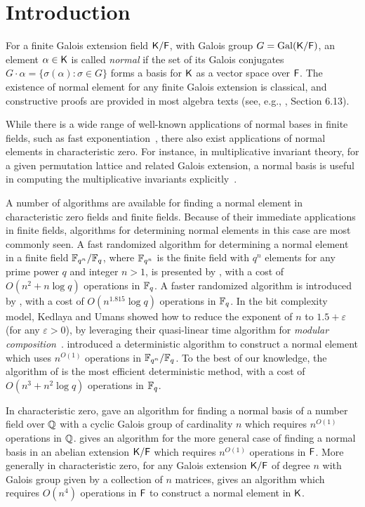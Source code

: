 \section{Introduction}

For a finite Galois extension field ${\mathsf{K}}/{\mathsf{F}}$, with Galois group $G =
\mathrm{Gal}({\mathsf{K}}/{\mathsf{F}})$, an element $\alpha \in {\mathsf{K}}$ is called
\emph{normal} if the set of its Galois conjugates $G \cdot \alpha =
\{ \sigma(\alpha): \sigma\in G\}$ forms a basis for ${\mathsf{K}}$ as a vector space over
${\mathsf{F}}$. The existence of normal element for any finite Galois extension
is classical, and constructive proofs are provided in most algebra texts
(see, e.g., \cite{Lang}, Section 6.13).
 
While there is a wide range of well-known applications of normal bases in
finite fields, such as fast exponentiation~\cite{GaGaPaSh00}, there also
exist applications of normal elements in characteristic zero.  For instance,
in multiplicative invariant theory, for a given permutation lattice and
related Galois extension, a normal basis is useful in computing the
multiplicative invariants explicitly~\cite{Jam18}.

A number of algorithms are available for finding a normal element in
characteristic zero fields and finite fields.  Because of their immediate
applications in finite fields, algorithms for determining normal elements
in this case are most commonly seen.  A fast randomized algorithm for
determining a normal element in a finite field ${\mathbb{F}}_{q^n}/{\mathbb{F}}_q$, where
${\mathbb{F}}_{q^n}$ is the finite field with $q^n$ elements for any prime power $q$
and integer $n>1$, is presented by , with a cost of
$O(n^2+n\log q)$ operations in ${\mathbb{F}}_q$.  A faster randomized algorithm is
introduced by , with a cost of $O(n^{1.815}\log q)$
operations in ${\mathbb{F}}_q$.  In the bit complexity model, Kedlaya and Umans showed
how to reduce the exponent of $n$ to $1.5+\varepsilon$ (for any
$\varepsilon > 0$), by leveraging their quasi-linear time algorithm for
{\em modular composition}~\cite{KeUm11}.  introduced a
deterministic algorithm to construct a normal element which uses $n^{O(1)}$
operations in ${\mathbb{F}}_{q^n}/{\mathbb{F}}_q$.  To the best of our knowledge, the
algorithm of  is the most efficient deterministic method,
with a cost of $O(n^3+n^2\log q)$ operations in ${\mathbb{F}}_q$.

In characteristic zero,  gave an algorithm for finding
a normal basis of a number field over $\mathbb{Q}$ with a cyclic Galois group
of cardinality $n$ which requires $n^{O(1)}$ operations in $\mathbb{Q}$.
 gives an algorithm for the more general case of finding
a normal basis in an abelian extension ${\mathsf{K}}/{\mathsf{F}}$ which requires
$n^{O(1)}$ operations in ${\mathsf{F}}$.  More generally in characteristic zero, for any
Galois extension ${\mathsf{K}}/{\mathsf{F}}$ of degree $n$ with Galois group given by a
collection of $n$ matrices,  gives an algorithm which
requires $O(n^4)$ operations in ${\mathsf{F}}$ to construct a normal element in
${\mathsf{K}}$.

